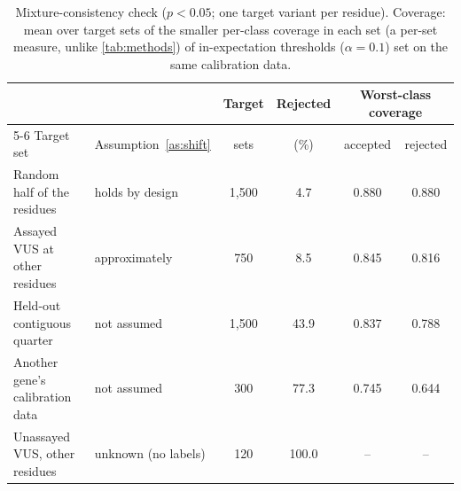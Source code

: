 \begin{table}[t]
\centering
\caption{Mixture-consistency check ($p<0.05$; one target variant per residue). Coverage: mean over target sets of the
smaller per-class coverage in each set (a per-set measure, unlike \cref{tab:methods}) of in-expectation thresholds
($\alpha=0.1$) set on the same calibration data.}\label{tab:mixture}
\setlength{\tabcolsep}{4pt}
\begin{tabular}{llcccc}
\toprule
 & & Target & Rejected & \multicolumn{2}{c}{Worst-class coverage}\\
\cmidrule(lr){5-6}
Target set & Assumption~\ref{as:shift} & sets & (\%) & accepted & rejected\\
\midrule
Random half of the residues & holds by design & 1,500 & 4.7 & 0.880 & 0.880 \\
Assayed VUS at other residues & approximately & 750 & 8.5 & 0.845 & 0.816 \\
Held-out contiguous quarter & not assumed & 1,500 & 43.9 & 0.837 & 0.788 \\
Another gene's calibration data & not assumed & 300 & 77.3 & 0.745 & 0.644 \\
Unassayed VUS, other residues & unknown (no labels) & 120 & 100.0 & -- & -- \\
\bottomrule
\end{tabular}
\end{table}
